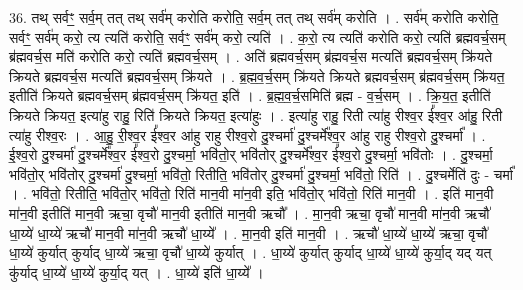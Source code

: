 \documentclass[17pt]{extarticle}
\begin{document}
36. तथ् सर्वꣳ॒॒ सर्व॒म् तत् तथ् सर्व॑म् करोति करोति॒ सर्व॒म् तत् तथ् सर्व॑म् करोति । . सर्व॑म् करोति करोति॒ सर्वꣳ॒॒ सर्व॑म् करो॒ त्य त्यति॑ करोति॒ सर्वꣳ॒॒ सर्व॑म् करो॒ त्यति॑ । . क॒रो॒ त्य त्यति॑ करोति करो॒ त्यति॑ ब्रह्मवर्च॒सम् ब्र॑ह्मवर्च॒स मति॑ करोति करो॒ त्यति॑ ब्रह्मवर्च॒सम् । . अति॑ ब्रह्मवर्च॒सम् ब्र॑ह्मवर्च॒स मत्यति॑ ब्रह्मवर्च॒सम् क्रि॑यते क्रियते ब्रह्मवर्च॒स मत्यति॑ ब्रह्मवर्च॒सम् क्रि॑यते । . ब्र॒ह्म॒व॒र्च॒सम् क्रि॑यते क्रियते ब्रह्मवर्च॒सम् ब्र॑ह्मवर्च॒सम् क्रि॑यत॒ इतीति॑ क्रियते ब्रह्मवर्च॒सम् ब्र॑ह्मवर्च॒सम् क्रि॑यत॒ इति॑ । . ब्र॒ह्म॒व॒र्च॒समिति॑ ब्रह्म - व॒र्च॒सम् । . क्रि॒य॒त॒ इतीति॑ क्रियते क्रियत॒ इत्या॑हु राहु॒ रिति॑ क्रियते क्रियत॒ इत्या॑हुः । . इत्या॑हु राहु॒ रिती त्या॑हु रीश्व॒र ई᳚श्व॒र आ॑हु॒ रिती त्या॑हु रीश्व॒रः । . आ॒हु॒ री॒श्व॒र ई᳚श्व॒र आ॑हु राहु रीश्व॒रो दु॒श्चर्मा॑ दु॒श्चर्मे᳚श्व॒र आ॑हु राहु रीश्व॒रो दु॒श्चर्मा᳚ । . ई॒श्व॒रो दु॒श्चर्मा॑ दु॒श्चर्मे᳚श्व॒र ई᳚श्व॒रो दु॒श्चर्मा॒ भवि॑तो॒र् भवि॑तोर् दु॒श्चर्मे᳚श्व॒र ई᳚श्व॒रो दु॒श्चर्मा॒ भवि॑तोः । . दु॒श्चर्मा॒ भवि॑तो॒र् भवि॑तोर् दु॒श्चर्मा॑ दु॒श्चर्मा॒ भवि॑तो॒ रितीति॒ भवि॑तोर् दु॒श्चर्मा॑ दु॒श्चर्मा॒ भवि॑तो॒ रिति॑ । . दु॒श्चर्मेति॑ दुः - चर्मा᳚ । . भवि॑तो॒ रितीति॒ भवि॑तो॒र् भवि॑तो॒ रिति॑ मान॒वी मा॑न॒वी इति॒ भवि॑तो॒र् भवि॑तो॒ रिति॑ मान॒वी । . इति॑ मान॒वी मा॑न॒वी इतीति॑ मान॒वी ऋचा॒ वृचौ॑ मान॒वी इतीति॑ मान॒वी ऋचौ᳚ । . मा॒न॒वी ऋचा॒ वृचौ॑ मान॒वी मा॑न॒वी ऋचौ॑ धा॒य्ये॑ धा॒य्ये॑ ऋचौ॑ मान॒वी मा॑न॒वी ऋचौ॑ धा॒य्ये᳚ । . मा॒न॒वी इति॑ मान॒वी । . ऋचौ॑ धा॒य्ये॑ धा॒य्ये॑ ऋचा॒ वृचौ॑ धा॒य्ये॑ कुर्यात् कुर्याद् धा॒य्ये॑ ऋचा॒ वृचौ॑ धा॒य्ये॑ कुर्यात् । . धा॒य्ये॑ कुर्यात् कुर्याद् धा॒य्ये॑ धा॒य्ये॑ कुर्या॒द् यद् यत् कु॑र्याद् धा॒य्ये॑ धा॒य्ये॑ कुर्या॒द् यत् । . धा॒य्ये॑ इति॑ धा॒य्ये᳚ । \newline
\end{document}
